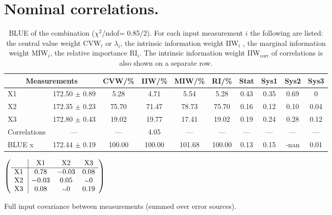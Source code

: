 \section{Nominal correlations.}
\begin{table}[H]
\scriptsize
\begin{center}
\renewcommand{\arraystretch}{1.1}
\begin{tabular}{|lc|c|c|c|c|cccc|}
\hline
\multicolumn{2}{|c|}{Measurements} & CVW/\%  & IIW/\%  & MIW/\%  & RI/\%  & {\tiny Stat} & {\tiny Sys1} & {\tiny Sys2} & {\tiny Sys3}\\
\hline
X1 &     172.50 $\pm$       0.89 &       5.28 &       4.71 &       5.54 &       5.28 &       0.43 &       0.35 &       0.69 &  0\\
X2 &     172.35 $\pm$       0.23 &      75.70 &      71.47 &      78.73 &      75.70 &       0.16 &       0.12 &       0.10 &       0.04\\
X3 &     172.80 $\pm$       0.43 &      19.02 &      19.77 &      17.41 &      19.02 &       0.19 &       0.24 &       0.28 &       0.12\\
Correlations & --- & --- &       4.05 & --- & --- & --- & --- & --- & ---\\
\hline
BLUE {\tiny x} &     172.44 $\pm$       0.19 &     100.00 &     100.00 &     101.68 &     100.00 &       0.13 &       0.15 &       -nan &       0.01\\
\hline
\end{tabular}
\caption{BLUE of the combination ($\chi^2$/ndof=      0.85/2).
 For each input measurement $i$ the following are listed: the central value weight CVW$_i$ or $\lambda_i$, the intrinsic information weight IIW$_i$ , the marginal information weight MIW$_i$, the relative importance RI$_i$. The intrinsic information weight IIW$_{\mathrm{corr}}$ of correlations is also shown on a separate row.}
\renewcommand{\arraystretch}{1}
\end{center}
\end{table}
\begin{table}[H]
\scriptsize
\begin{center}
\renewcommand{\arraystretch}{1.1}
\begin{math}\left(\begin{array}{c|ccc}
 & \mathrm{X1} & 
\mathrm{X2} & 
\mathrm{X3} \\
\hline
\mathrm{X1} \hspace*{2pt} &       0.78 &      -0.03 &       0.08 \\
\mathrm{X2} \hspace*{2pt} &      -0.03 &       0.05 &  {\scriptstyle \sim }0 \\
\mathrm{X3} \hspace*{2pt} &       0.08 &  {\scriptstyle \sim }0 &       0.19 \\
\end{array}\right)\end{math}
\caption{Full input covariance between measurements (summed over error sources).}
\renewcommand{\arraystretch}{1}
\end{center}
\end{table}
